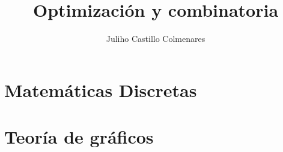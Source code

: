 \documentclass[
twoside,
12pt,
letterpaper, 
justified
]{tufte-book}
\title{Optimización y combinatoria}
\author[J. Castillo]{Juliho Castillo Colmenares}
\begin{document}
	\maketitle
	\tableofcontents

\chapter{Matemáticas Discretas}





\chapter{Teoría de gráficos}




{}

\end{document}
